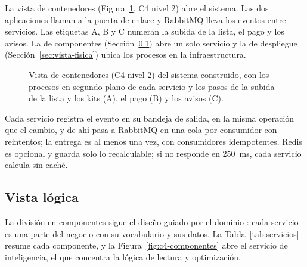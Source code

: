 La vista de contenedores (Figura~\ref{fig:c4-contenedores}, C4 nivel 2) abre el sistema. Las dos aplicaciones llaman a la puerta de enlace y RabbitMQ lleva los eventos entre servicios. Las etiquetas A, B y C numeran la subida de la lista, el pago y los avisos. La de componentes (Sección~\ref{sec:vista-logica}) abre un solo servicio y la de despliegue (Sección~\ref{sec:vista-fisica}) ubica los procesos en la infraestructura.

\begin{figure}[p]
\centering
\resizebox{0.84\textwidth}{!}{}
\caption{Vista de contenedores (C4 nivel 2) del sistema construido, con los procesos en
segundo plano de cada servicio y los pasos de la subida de la lista y los kits (A), el pago (B)
y los avisos (C).}
\label{fig:c4-contenedores}
\end{figure}

Cada servicio registra el evento en su bandeja de salida, en la misma operación que el cambio, y de ahí pasa a RabbitMQ en una cola por consumidor con reintentos; la entrega es al menos una vez, con consumidores idempotentes. Redis es opcional y guarda solo lo recalculable; si no responde en 250~ms, cada servicio calcula sin caché.

\subsection{Vista lógica}
\label{sec:vista-logica}

La división en componentes sigue el diseño guiado por el dominio \citep{evans_domain-driven_2004}: cada servicio es una parte del negocio con su vocabulario y sus datos. La Tabla~\ref{tab:servicios} resume cada componente, y la Figura~\ref{fig:c4-componentes} abre el servicio de inteligencia, el que concentra la lógica de lectura y optimización.

